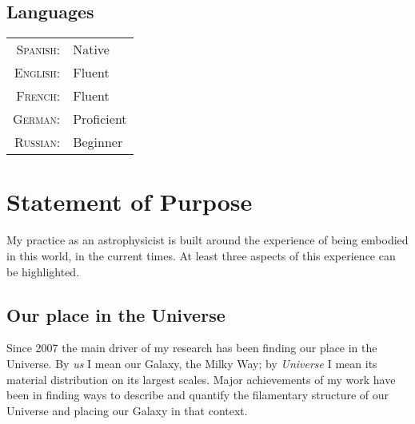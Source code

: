 \documentclass[a4paper,10pt]{article} %
\begin{document}


\subsection{Languages}

\begin{tabular}{rl}
\textsc{Spanish:} & Native\\
\textsc{English:} & Fluent\\
\textsc{French:} & Fluent \\
\textsc{German:} & Proficient \\
\textsc{Russian:} & Beginner \\
\end{tabular}

\color{red}
\section{Statement of Purpose}
\color{black}

My practice as an astrophysicist is built around the experience of being
embodied in this world, in the current times.  
At least three aspects
of this experience can be highlighted.



\subsection{Our place in the Universe}

Since 2007 the main driver of my research has been finding our place
in the Universe. By \emph{us} I mean our Galaxy, the Milky Way; by
\emph{Universe} I mean its material distribution on its largest scales.
Major achievements of my work have been in finding ways to describe and
quantify the filamentary structure of our Universe 
and placing our Galaxy in that context. 
\end{document}
